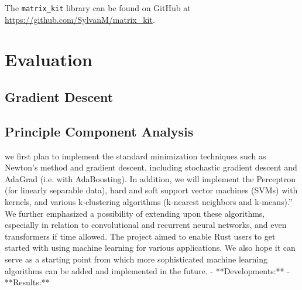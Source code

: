 \documentclass[12pt, letterpaper]{article}
\theoremstyle{definition}
\theoremstyle{remark}
\begin{document}
The \texttt{matrix\_kit} library can be found on GitHub at \url{https://github.com/SylvanM/matrix_kit}.

\section{Evaluation}

\subsection{Gradient Descent}

\subsection{Principle Component Analysis}



    we first plan to implement the standard minimization techniques such as Newton’s method and gradient descent, 
    including stochastic gradient descent and AdaGrad (i.e. with AdaBoosting). In addition, we will implement the 
    Perceptron (for linearly separable data), hard and soft support vector machines (SVMs) with kernels, and various 
    k-clustering algorithms (k-nearest neighbors and k-means).” We further emphasized a possibility of extending upon 
    these algorithms, especially in relation to convolutional and recurrent neural networks, and even transformers if 
    time allowed. The project aimed to enable Rust users to get started with using machine learning for various applications.
     We also hope it can serve as a starting point from which more sophisticated machine learning algorithms can be added and 
     implemented in the future.
- **Developments:**
- **Results:**
\end{document}
